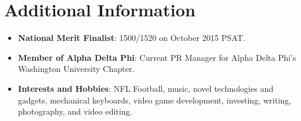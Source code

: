 \documentclass[letterpaper,11pt]{article}
\newcommand{\resumeItem}[2]{
  \item\small{
    \textbf{#1}{: #2 \vspace{-2pt}}
  }
}
\newcommand{\resumeSubItem}[2]{\resumeItem{#1}{#2}\vspace{-4pt}}
\newcommand{\resumeSubHeadingListStart}{\begin{itemize}[leftmargin=*]}
\newcommand{\resumeSubHeadingListEnd}{\end{itemize}}
\begin{document}
\section{Additional Information}

	\resumeSubHeadingListStart
		\resumeSubItem{National Merit Finalist}
		{1500/1520 on October 2015 PSAT.}
		\resumeSubItem{Member of Alpha Delta Phi}
		{Current PR Manager for Alpha Delta Phi's Washington University Chapter.}
		\resumeSubItem{Interests and Hobbies}
		{NFL Football, music, novel technologies and gadgets, mechanical keyboards, video game development, investing, writing, photography, and video editing.}
	\resumeSubHeadingListEnd
	
\end{document}
